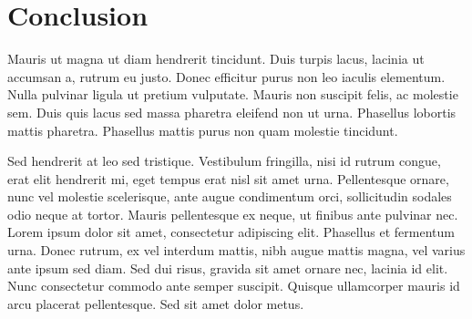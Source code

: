 \section{Conclusion}

Mauris ut magna ut diam hendrerit tincidunt. Duis turpis lacus, lacinia ut accumsan a, rutrum eu justo. Donec efficitur purus non leo iaculis elementum. Nulla pulvinar ligula ut pretium vulputate. Mauris non suscipit felis, ac molestie sem. Duis quis lacus sed massa pharetra eleifend non ut urna. Phasellus lobortis mattis pharetra. Phasellus mattis purus non quam molestie tincidunt.

Sed hendrerit at leo sed tristique. Vestibulum fringilla, nisi id rutrum congue, erat elit hendrerit mi, eget tempus erat nisl sit amet urna. Pellentesque ornare, nunc vel molestie scelerisque, ante augue condimentum orci, sollicitudin sodales odio neque at tortor. Mauris pellentesque ex neque, ut finibus ante pulvinar nec. Lorem ipsum dolor sit amet, consectetur adipiscing elit. Phasellus et fermentum urna. Donec rutrum, ex vel interdum mattis, nibh augue mattis magna, vel varius ante ipsum sed diam. Sed dui risus, gravida sit amet ornare nec, lacinia id elit. Nunc consectetur commodo ante semper suscipit. Quisque ullamcorper mauris id arcu placerat pellentesque. Sed sit amet dolor metus.